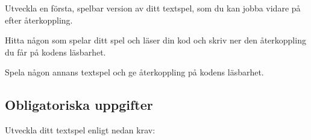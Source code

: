 
\Lab{\LabWeekTHREE}
\begin{Goals}

\end{Goals}

\begin{Preparations}
\item {}
\item {}
\item Utveckla en första, spelbar version av ditt textspel, som du kan jobba vidare på efter återkoppling.
\item Hitta någon som spelar ditt spel och läser din kod och skriv ner den återkoppling du får på kodens läsbarhet.
\item Spela någon annans textspel och ge återkoppling på kodens läsbarhet.
\end{Preparations}


\subsection{Obligatoriska uppgifter}

Utveckla ditt textspel enligt nedan krav:

